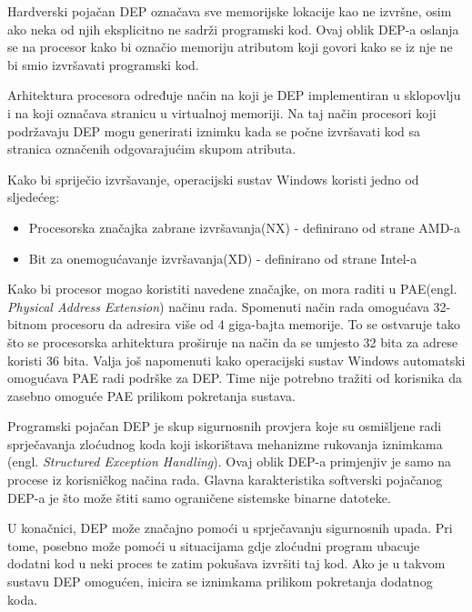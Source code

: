 \documentclass[times, utf8, diplomski, numeric]{fer}
\begin{document}
Hardverski pojačan DEP označava sve memorijske lokacije kao ne			%
izvršne, osim ako neka od njih eksplicitno ne sadrži programski			%
kod. Ovaj oblik DEP-a oslanja se na procesor kako bi označio			%
memoriju atributom koji govori kako se iz nje ne bi smio
izvršavati programski kod.

Arhitektura procesora određuje način na koji je DEP implementiran
u sklopovlju i na koji označava stranicu u virtualnoj memoriji.			%
Na taj način procesori koji podržavaju DEP mogu generirati
iznimku kada se počne izvršavati kod sa stranica označenih
odgovarajućim skupom atributa.

Kako bi spriječio izvršavanje, operacijski sustav Windows koristi
jedno od sljedećeg:

\begin{itemize}
\item Procesorska značajka zabrane izvršavanja(NX) - definirano od strane AMD-a
\item Bit za onemogućavanje izvršavanja(XD) - definirano od strane Intel-a
\end{itemize}

Kako bi procesor mogao koristiti navedene značajke, on mora
raditi u PAE(engl. \emph{Physical Address
Extension})\citep{pae_ms} načinu rada. Spomenuti način rada
omogućava 32-bitnom procesoru da adresira više od 4 giga-bajta
memorije. To se ostvaruje tako što se procesorska arhitektura
proširuje na način da se umjesto 32 bita za adrese koristi 36
bita. Valja još napomenuti kako operacijski sustav Windows
automatski omogućava PAE radi podrške za DEP. Time nije potrebno		%
tražiti od korisnika da zasebno omoguće PAE prilikom pokretanja
sustava.

Programski pojačan DEP je skup sigurnosnih provjera koje su
osmišljene radi sprječavanja zloćudnog koda koji iskorištava
mehanizme rukovanja iznimkama (engl. \emph{Structured Exception
Handling}). Ovaj oblik DEP-a primjenjiv je samo na procese iz
korisničkog načina rada. Glavna karakteristika softverski
pojačanog DEP-a je što može štiti samo ograničene sistemske
binarne datoteke.

U konačnici, DEP može značajno pomoći u sprječavanju sigurnosnih
upada. Pri tome, posebno može pomoći u situacijama gdje zloćudni
program ubacuje dodatni kod u neki proces te zatim pokušava
izvršiti taj kod. Ako je u takvom sustavu DEP omogućen, inicira
se iznimkama prilikom pokretanja dodatnog koda.
\end{document}
